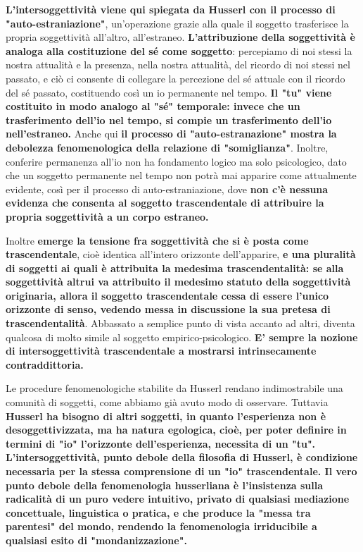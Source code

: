\textbf{L'intersoggettività viene qui spiegata da Husserl con il
processo di "auto-estraniazione"}, un'operazione grazie
alla quale il soggetto trasferisce la propria soggettività
all'altro, all'estraneo. \textbf{L'attribuzione della
soggettività è analoga alla costituzione del sé
come soggetto}: percepiamo di noi stessi la nostra
attualità e la presenza, nella nostra attualità, del
ricordo di noi stessi nel passato, e ciò ci consente di collegare
la percezione del sé attuale con il ricordo del sé
passato, costituendo così un io permanente nel
tempo. \textbf{Il "tu" viene costituito in modo analogo
al "sé" temporale: invece che un trasferimento
dell'io nel tempo, si compie un trasferimento
dell'io nell'estraneo.}
Anche qui \textbf{il processo di "auto-estranazione" mostra
la debolezza fenomenologica della relazione di
"somiglianza"}. Inoltre, conferire permanenza all'io
non ha fondamento logico ma solo psicologico, dato che
un soggetto permanente nel tempo non potrà mai
apparire come attualmente evidente, così per il
processo di auto-estraniazione, dove \textbf{non c'è nessuna
evidenza che consenta al soggetto trascendentale
di attribuire la propria soggettività a un corpo
estraneo.}

Inoltre \textbf{emerge la tensione fra soggettività  che si è posta come trascendentale}, cioè identica all'intero orizzonte dell'apparire, \textbf{e una pluralità di soggetti ai quali è attribuita la medesima trascendentalità: se alla soggettività altrui va attribuito il medesimo statuto della soggettività originaria, allora il soggetto trascendentale cessa di essere l'unico orizzonte di senso, vedendo messa in discussione la sua pretesa di trascendentalità}. Abbassato a semplice punto di vista accanto ad altri, diventa qualcosa di molto simile al soggetto empirico-psicologico. \textbf{E' sempre la nozione di intersoggettività trascendentale a mostrarsi intrinsecamente contraddittoria.}

Le procedure fenomenologiche stabilite da Husserl rendano indimostrabile una comunità di soggetti, come abbiamo già avuto modo di osservare. Tuttavia \textbf{Husserl ha bisogno di altri soggetti, in quanto l'esperienza non è desoggettivizzata, ma ha natura egologica, cioè, per poter definire in termini di "io" l'orizzonte dell'esperienza, necessita di un "tu". L'intersoggettività, punto debole della filosofia di Husserl, è condizione necessaria per la stessa comprensione di un "io" trascendentale. Il vero punto debole della fenomenologia husserliana è l'insistenza sulla radicalità di un puro vedere intuitivo, privato di qualsiasi mediazione concettuale, linguistica o pratica, e che produce la "messa tra parentesi" del mondo,  rendendo la fenomenologia irriducibile a qualsiasi esito di "mondanizzazione".}

